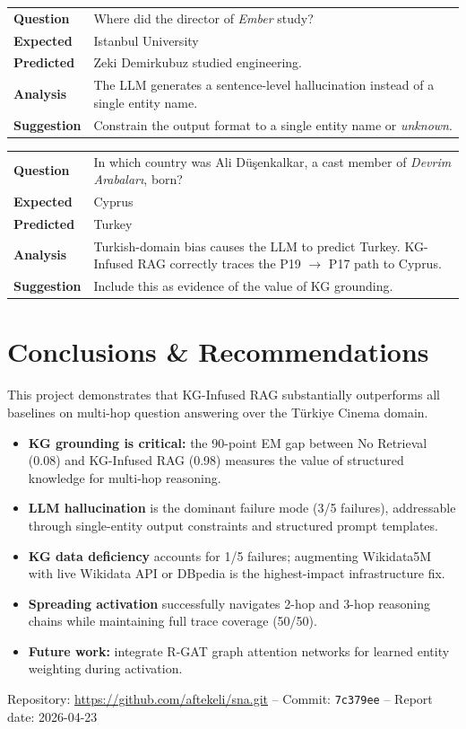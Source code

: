 \documentclass[11pt,a4paper]{article}
\begin{document}
\begin{tcolorbox}[failorange,title={Case 4 - LLM Selection Error | No Retrieval}]
\begin{tabular}{@{}L{2.8cm}L{10.4cm}@{}}
\textbf{Question} & Where did the director of \emph{Ember} study? \\[2pt]
\textbf{Expected} & Istanbul University \\
\textbf{Predicted} & Zeki Demirkubuz studied engineering. \\[4pt]
\textbf{Analysis} & The LLM generates a sentence-level hallucination instead of a single entity name. \\[4pt]
\textbf{Suggestion} & Constrain the output format to a single entity name or \emph{unknown}.
\end{tabular}
\end{tcolorbox}

\begin{tcolorbox}[failorange,title={Case 5 - LLM Selection Error | No Retrieval}]
\begin{tabular}{@{}L{2.8cm}L{10.4cm}@{}}
\textbf{Question} & In which country was Ali Düşenkalkar, a cast member of \emph{Devrim Arabaları}, born? \\[2pt]
\textbf{Expected} & Cyprus \\
\textbf{Predicted} & Turkey \\[4pt]
\textbf{Analysis} & Turkish-domain bias causes the LLM to predict Turkey. KG-Infused RAG correctly traces the P19 $\to$ P17 path to Cyprus. \\[4pt]
\textbf{Suggestion} & Include this as evidence of the value of KG grounding.
\end{tabular}
\end{tcolorbox}

\section{Conclusions \& Recommendations}

This project demonstrates that KG-Infused RAG substantially outperforms all baselines on multi-hop question answering over the Türkiye Cinema domain.

\begin{itemize}
\item \textbf{KG grounding is critical:} the 90-point EM gap between No Retrieval (0.08) and KG-Infused RAG (0.98) measures the value of structured knowledge for multi-hop reasoning.
\item \textbf{LLM hallucination} is the dominant failure mode (3/5 failures), addressable through single-entity output constraints and structured prompt templates.
\item \textbf{KG data deficiency} accounts for 1/5 failures; augmenting Wikidata5M with live Wikidata API or DBpedia is the highest-impact infrastructure fix.
\item \textbf{Spreading activation} successfully navigates 2-hop and 3-hop reasoning chains while maintaining full trace coverage (50/50).
\item \textbf{Future work:} integrate R-GAT graph attention networks for learned entity weighting during activation.
\end{itemize}

\bigskip
\begin{center}
\small\color{MutedGray}
Repository: \url{https://github.com/aftekeli/sna.git}
\quad -- \quad
Commit: \texttt{7c379ee}
\quad -- \quad
Report date: 2026-04-23
\end{center}
\end{document}
